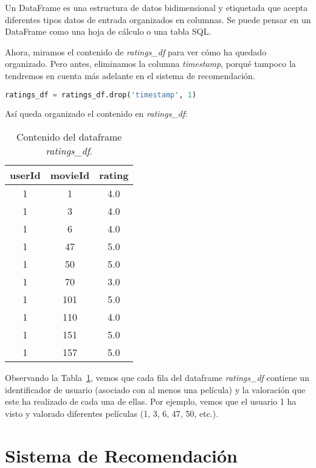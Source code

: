 \documentclass{uimppracticas}
\begin{document}
\begin{definition}\label{dataframe}
	Un DataFrame es una estructura de datos bidimensional y etiquetada que acepta diferentes tipos datos de entrada organizados en columnas. Se puede pensar en un DataFrame como una hoja de cálculo o una tabla SQL.
\end{definition}

Ahora, miramos el contenido de \textit{ratings\_df} para ver cómo ha quedado organizado. Pero antes, eliminamos la columna \textit{timestamp}, porqué tampoco la tendremos en cuenta más adelante en el sistema de recomendación.

\begin{lstlisting}[language=python, basicstyle=\small]
ratings_df = ratings_df.drop('timestamp', 1)
\end{lstlisting}

Así queda organizado el contenido en \textit{ratings\_df}:

\begin{table}[H]
	\centering
	\begin{tabular}{ccc}
		\toprule
		userId &  movieId &  rating \\
		\midrule
		1 &        1 &     4.0 \\
		1 &        3 &     4.0 \\
		1 &        6 &     4.0 \\
		1 &       47 &     5.0 \\
		1 &       50 &     5.0 \\
		1 &       70 &     3.0 \\
		1 &      101 &     5.0 \\
		1 &      110 &     4.0 \\
		1 &      151 &     5.0 \\
		1 &      157 &     5.0 \\
		\bottomrule
	\end{tabular}
	\caption{Contenido del dataframe \textit{ratings\_df}.}
	\label{ratings_df}
\end{table}

Observando la Tabla~\ref{ratings_df}, vemos que cada fila del dataframe \textit{ratings\_df} contiene un identificador de usuario (asociado con al menos una película) y la valoración que este ha realizado de cada una de ellas. Por ejemplo, vemos que el usuario 1 ha visto y valorado diferentes películas (1, 3, 6, 47, 50, etc.).

\section{Sistema de Recomendación}\label{sistema_recomendacion}
\end{document}
